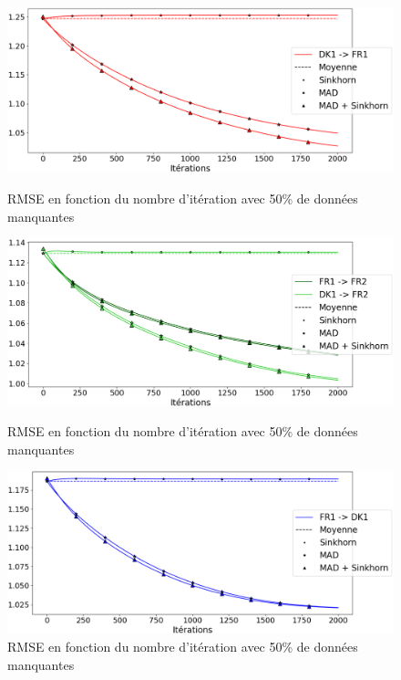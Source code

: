 \documentclass[acmsmall, natbib=false, nonacm]{acmart}
\begin{document}
\begin{figure}[H]
	\begin{minipage}[b]{0.4\linewidth}
		\centering \includegraphics[scale=0.14]{images/50_ar_FR1.png}
		\caption{RMSE en fonction du nombre d'itération avec 50\% de données manquantes}
	\end{minipage}\hfill
    \begin{minipage}[b]{0.4\linewidth}
		\centering \includegraphics[scale=0.14]{images/50_ar_FR2.png}
		\caption{RMSE en fonction du nombre d'itération avec 50\% de données manquantes}
	\end{minipage}\hfill
    \begin{minipage}[b]{0.4\linewidth}
		\centering \includegraphics[scale=0.14]{images/50_ar_DK1.png}
		\caption{RMSE en fonction du nombre d'itération avec 50\% de données manquantes}
	\end{minipage}\hfill

\end{figure}
\end{document}

